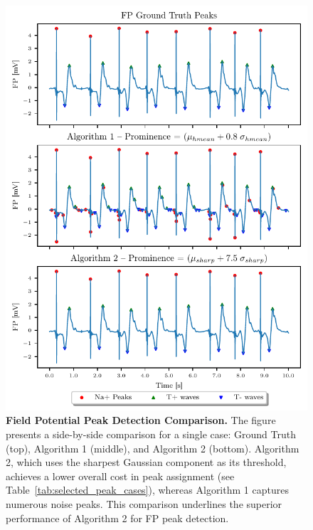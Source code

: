 \documentclass{report}
\begin{document}
            \begin{figure}[H]
                \centering
                \includegraphics[width=1\textwidth, keepaspectratio]{plots/chapter_3/peak-comparison-target-case.pdf}
                \caption[Field Potential Peak detection comparison]{
                   \textbf{Field Potential Peak Detection Comparison.} The figure presents a side-by-side comparison for a single case: Ground Truth (top), Algorithm 1 (middle), and Algorithm 2 (bottom). Algorithm 2, which uses the sharpest Gaussian component as its threshold, achieves a lower overall cost in peak assignment (see Table~\ref{tab:selected_peak_cases}), whereas Algorithm 1 captures numerous noise peaks. This comparison underlines the superior performance of Algorithm 2 for FP peak detection.
                    }
                \label{fig:fp-gmm-thresholding-comparision-single-case}
            \end{figure}
            
\end{document}
